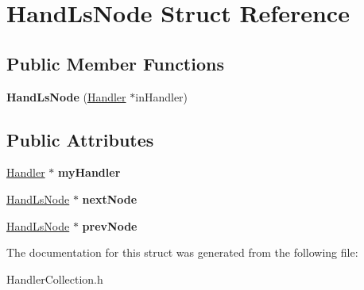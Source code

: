\hypertarget{struct_hand_ls_node}{}\section{Hand\+Ls\+Node Struct Reference}
\label{struct_hand_ls_node}
\subsection*{Public Member Functions}
\begin{DoxyCompactItemize}
\item 
\hypertarget{struct_hand_ls_node_a569a10760d13333ed184aedc0104ff26}{}\label{struct_hand_ls_node_a569a10760d13333ed184aedc0104ff26} 
{\bfseries Hand\+Ls\+Node} (\hyperlink{class_handler}{Handler} $\ast$in\+Handler)
\end{DoxyCompactItemize}
\subsection*{Public Attributes}
\begin{DoxyCompactItemize}
\item 
\hypertarget{struct_hand_ls_node_a0e8014f915df2512d0ad44f32003d710}{}\label{struct_hand_ls_node_a0e8014f915df2512d0ad44f32003d710} 
\hyperlink{class_handler}{Handler} $\ast$ {\bfseries my\+Handler}
\item 
\hypertarget{struct_hand_ls_node_a38ea26d6ddfa4170763bad9d06d435bb}{}\label{struct_hand_ls_node_a38ea26d6ddfa4170763bad9d06d435bb} 
\hyperlink{struct_hand_ls_node}{Hand\+Ls\+Node} $\ast$ {\bfseries next\+Node}
\item 
\hypertarget{struct_hand_ls_node_a6e42f95e93458d11cb562d3d986f6733}{}\label{struct_hand_ls_node_a6e42f95e93458d11cb562d3d986f6733} 
\hyperlink{struct_hand_ls_node}{Hand\+Ls\+Node} $\ast$ {\bfseries prev\+Node}
\end{DoxyCompactItemize}


The documentation for this struct was generated from the following file\+:\begin{DoxyCompactItemize}
\item 
Handler\+Collection.\+h\end{DoxyCompactItemize}
